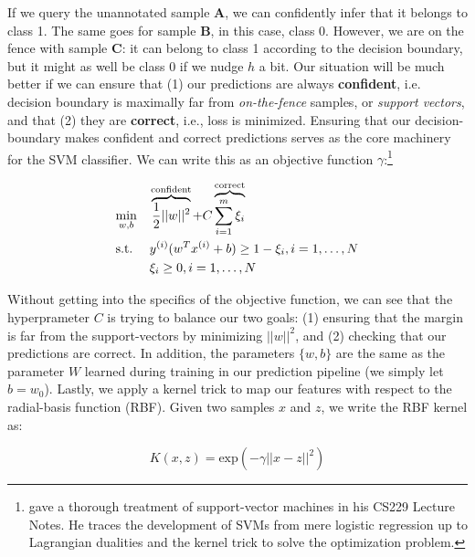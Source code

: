 \par If we query the unannotated sample $\mathbf{A}$, we can confidently infer
that it belongs to class 1. The same goes for sample $\mathbf{B}$, in this
case, class 0. However, we are on the fence with sample $\mathbf{C}$: it can
belong to class 1 according to the decision boundary, but it might as well be
class 0 if we nudge $h$ a bit. Our situation will be much better if we can
ensure that (1) our predictions are always \textbf{confident}, i.e. decision
boundary is maximally far from \textit{on-the-fence} samples, or
\textit{support vectors}, and that (2) they are \textbf{correct}, i.e., loss is
minimized. Ensuring that our decision-boundary makes confident and correct
predictions serves as the core machinery for the SVM classifier. We can write
this as an objective function $\gamma$:\footnote{\cite{ng2012support} gave a
thorough treatment of support-vector machines in his CS229 Lecture Notes. He
traces the development of SVMs from mere logistic regression up to Lagrangian
dualities and the kernel trick to solve the optimization problem.}

\begin{equation}
\begin{aligned}
\label{eqn:svm}
    & \underset{w,b}{\text{min}}
    & & \overbrace{\dfrac{1}{2}||w||^{2}}^{\mathclap{\text{confident}}} +
    C\overbrace{\sum_{i=1}^{m}{\xi_i}}^{\mathclap{\text{correct}}} \\
    & \text{s.t.}
    & & y^{(i)}(w^{T}x^{(i)} + b) \geq 1 - \xi_i, i=1,\dots,N \\
    &&& \xi_i \geq 0, i=1,\dots,N
\end{aligned}
\end{equation}

\par Without getting into the specifics of the objective function, we can see
that the hyperprameter $C$ is trying to balance our two goals: (1) ensuring
that the margin is far from the support-vectors by minimizing $||w||^{2}$, and
(2) checking that our predictions are correct. In addition, the parameters
$\{w, b\}$ are the same as the parameter $W$ learned during training in our
prediction pipeline (we simply let $b=w_0$). Lastly, we apply a kernel trick
to map our features with respect to the radial-basis function (RBF). Given two
samples $x$ and $z$, we write the RBF kernel as:

\begin{equation}
\label{eqn:kernel}
    K(x,z) = \text{exp} \left(-\gamma||x-z||^{2}\right)
\end{equation}

